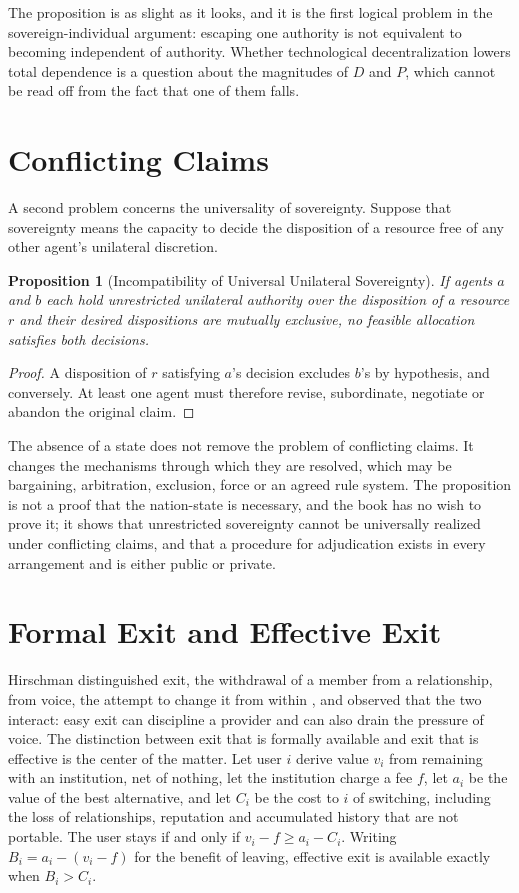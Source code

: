 \documentclass[11pt,twoside,openany]{book}
\newtheorem{proposition}[theorem]{Proposition}
\theoremstyle{definition}
\theoremstyle{remark}
\begin{document}
The proposition is as slight as it looks, and it is the first logical problem in the sovereign-individual argument: escaping one authority is not equivalent to becoming independent of authority. Whether technological decentralization lowers total dependence is a question about the magnitudes of $D$ and $P$, which cannot be read off from the fact that one of them falls.

\section{Conflicting Claims}

A second problem concerns the universality of sovereignty. Suppose that sovereignty means the capacity to decide the disposition of a resource free of any other agent's unilateral discretion.

\begin{proposition}[Incompatibility of Universal Unilateral Sovereignty]\label{prop:conflict}
If agents $a$ and $b$ each hold unrestricted unilateral authority over the disposition of a resource $r$ and their desired dispositions are mutually exclusive, no feasible allocation satisfies both decisions.
\end{proposition}
\begin{proof}
A disposition of $r$ satisfying $a$'s decision excludes $b$'s by hypothesis, and conversely. At least one agent must therefore revise, subordinate, negotiate or abandon the original claim.
\end{proof}

The absence of a state does not remove the problem of conflicting claims. It changes the mechanisms through which they are resolved, which may be bargaining, arbitration, exclusion, force or an agreed rule system. The proposition is not a proof that the nation-state is necessary, and the book has no wish to prove it; it shows that unrestricted sovereignty cannot be universally realized under conflicting claims, and that a procedure for adjudication exists in every arrangement and is either public or private.

\section{Formal Exit and Effective Exit}

Hirschman distinguished exit, the withdrawal of a member from a relationship, from voice, the attempt to change it from within \cite{hirschman1970}, and observed that the two interact: easy exit can discipline a provider and can also drain the pressure of voice. The distinction between exit that is formally available and exit that is effective is the center of the matter. Let user $i$ derive value $v_i$ from remaining with an institution, net of nothing, let the institution charge a fee $f$, let $a_i$ be the value of the best alternative, and let $C_i$ be the cost to $i$ of switching, including the loss of relationships, reputation and accumulated history that are not portable. The user stays if and only if $v_i-f\ge a_i-C_i$. Writing $B_i=a_i-(v_i-f)$ for the benefit of leaving, effective exit is available exactly when $B_i>C_i$.
\end{document}
